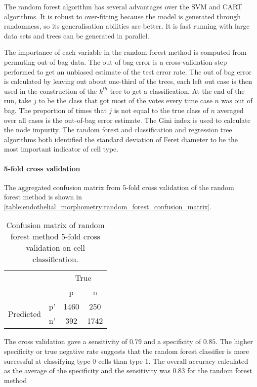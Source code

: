 The random forest algorithm has several advantages over the SVM and CART algorithms. It is robust to over-fitting because the model is generated through randomness, so its generalisation abilities are better. It is fast running with large data sets and trees can be generated in parallel.

The importance of each variable in the random forest method is computed from permuting out-of bag data. The out of bag error is a cross-validation step performed to get an unbiased estimate of the test error rate. The out of bag error is calculated by leaving out about one-third of the trees, each left out case is then used in the construction of the $k^{th}$ tree to get a classification. At the end of the run, take $j$ to be the class that got most of the votes every time case $n$ was out of bag. The proportion of times that $j$ is not equal to the true class of $n$ averaged over all cases is the out-of-bag error estimate. The Gini index is used to calculate the node impurity. The random forest and classification and regression tree algorithms both identified the standard deviation of Feret diameter to be the most important indicator of cell type.

\paragraph{5-fold cross validation}
The aggregated confusion matrix from 5-fold cross validation of the random forest method is shown in \autoref{table:endothelial_morphometry:random_forest_confusion_matrix}.
\begin{table}[htbp!]
\caption[Confusion matrix of random forest cross validation on cell classification]{Confusion matrix of random forest method 5-fold cross validation on cell classification.}
\label{table:endothelial_morphometry:random_forest_confusion_matrix}
\centering
\begin{tabular}{cc|cc}
	\multicolumn{2}{c}{}&\multicolumn{2}{c}{True}\\
	\multicolumn{2}{c|}{}& p & n\\
	\cline{2-4}
	\multirow{2}{*}{Predicted}& p' & 1460 & 250\\ & n' & 392 & 1742\\
\end{tabular}
\end{table}

The cross validation gave a sensitivity of $0.79$ and a specificity of $0.85$. The higher specificity or true negative rate suggests that the random forest classifier is more successful at classifying type 0 cells than type 1. The overall accuracy calculated as the average of the specificity and the sensitivity was $0.83$ for the random forest method

